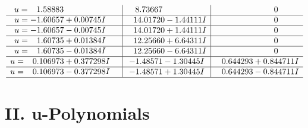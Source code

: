 \documentclass[1p]{elsarticle_modified}
\theoremstyle{definition}
\begin{document}
$$\begin{array}{c|c|c}
\begin{aligned}
u &= \phantom{-}1.58883\phantom{ +0.000000I}\end{aligned}
 & \phantom{-}8.73667\phantom{ +0.000000I} & \phantom{-0.000000 } 0 \\ \hline\begin{aligned}
u &= -1.60657 + 0.00745 I\end{aligned}
 & \phantom{-}14.01720 - 1.44111 I & \phantom{-0.000000 } 0 \\ \hline\begin{aligned}
u &= -1.60657 - 0.00745 I\end{aligned}
 & \phantom{-}14.01720 + 1.44111 I & \phantom{-0.000000 } 0 \\ \hline\begin{aligned}
u &= \phantom{-}1.60735 + 0.01384 I\end{aligned}
 & \phantom{-}12.25660 + 6.64311 I & \phantom{-0.000000 } 0 \\ \hline\begin{aligned}
u &= \phantom{-}1.60735 - 0.01384 I\end{aligned}
 & \phantom{-}12.25660 - 6.64311 I & \phantom{-0.000000 } 0 \\ \hline\begin{aligned}
u &= \phantom{-}0.106973 + 0.377298 I\end{aligned}
 & -1.48571 - 1.30445 I & \phantom{-}0.644293 + 0.844711 I \\ \hline\begin{aligned}
u &= \phantom{-}0.106973 - 0.377298 I\end{aligned}
 & -1.48571 + 1.30445 I & \phantom{-}0.644293 - 0.844711 I\\
 \hline 
 \end{array}$$\newpage
\newpage\renewcommand{\arraystretch}{1}
\centering \section*{ II. u-Polynomials}
\end{document}
